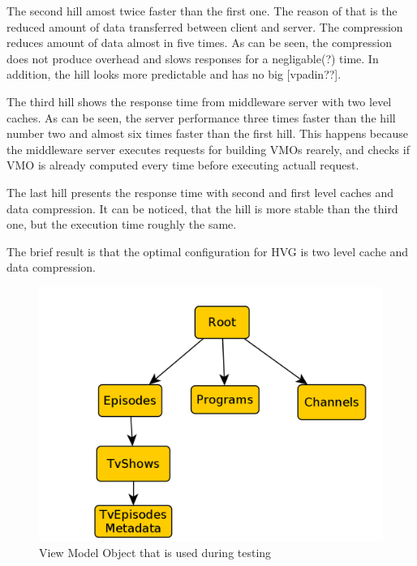The second hill amost twice faster than the first one. The reason of that is the reduced amount of data transferred between client and server. The compression reduces amount of data almost in five times. As can be seen, the compression does not produce overhead and slows responses for a negligable(?) time. In addition, the hill looks more predictable and has no big [vpadin??].  

The third hill shows the response time from middleware server with two level caches. As can be seen, the server performance three times faster than the hill number two and almost six times faster than the first hill. This happens because the middleware server executes requests for building VMOs rearely, and checks if VMO is already computed every time before executing actuall request. 

The last hill presents the response time with second and first level caches and data compression. It can be noticed, that the hill is more stable than the third one, but the execution time roughly the same.

The brief result is that the optimal configuration for HVG is two level cache and data compression.

\begin{figure}[h]
    \centering
    \includegraphics[width=\textwidth]{images/vmo_test_example.png}
    \caption{View Model Object that is used during testing}
    \label{fig:vmo_test_example}
\end{figure}



